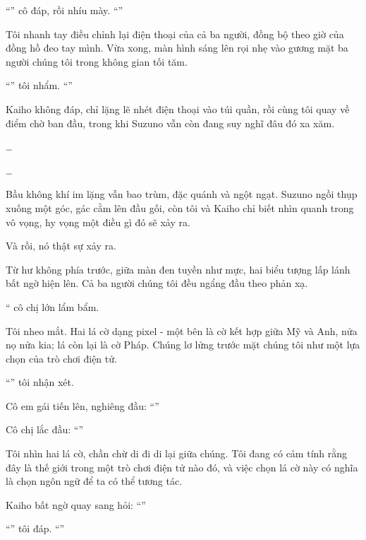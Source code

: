 \documentclass[../main.tex]{subfiles}
\begin{document}
``'' cô đáp, rồi nhíu mày. ``''

Tôi nhanh tay điều chỉnh lại điện thoại của cả ba người, đồng bộ theo giờ của đồng hồ đeo tay mình. Vừa xong, màn hình sáng lên rọi nhẹ vào gương mặt ba người chúng tôi trong không gian tối tăm.

``'' tôi nhẩm. ``''

Kaiho không đáp, chỉ lặng lẽ nhét điện thoại vào túi quần, rồi cùng tôi quay về điểm chờ ban đầu, trong khi Suzuno vẫn còn đang suy nghĩ đâu đó xa xăm.

\ct

\dots

\dots

Bầu không khí im lặng vẫn bao trùm, đặc quánh và ngột ngạt. Suzuno ngồi thụp xuống một góc, gác cằm lên đầu gối, còn tôi và Kaiho chỉ biết nhìn quanh trong vô vọng, hy vọng một điều gì đó sẽ xảy ra.

Và rồi, nó thật sự xảy ra.

Từ hư không phía trước, giữa màn đen tuyền như mực, hai biểu tượng lấp lánh bất ngờ hiện lên. Cả ba người chúng tôi đều ngẩng đầu theo phản xạ.

`` cô chị lớn lẩm bẩm.

Tôi nheo mắt. Hai lá cờ dạng pixel - một bên là cờ kết hợp giữa Mỹ và Anh, nửa nọ nửa kia; lá còn lại là cờ Pháp. Chúng lơ lửng trước mặt chúng tôi như một lựa chọn của trò chơi điện tử.

``'' tôi nhận xét.

Cô em gái tiến lên, nghiêng đầu: ``''

Cô chị lắc đầu: ``''

Tôi nhìn hai lá cờ, chần chừ di đi di lại giữa chúng. Tôi đang có cảm tính rằng đây là thế giới trong một trò chơi điện tử nào đó, và việc chọn lá cờ này có nghĩa là chọn ngôn ngữ để ta có thể tương tác.

Kaiho bất ngờ quay sang hỏi: ``''

``'' tôi đáp. ``''
\end{document}
